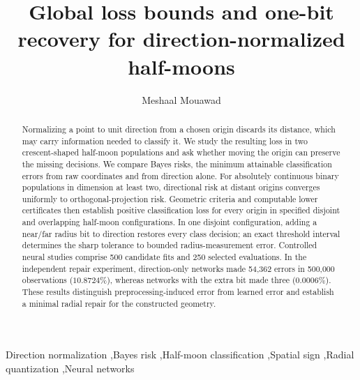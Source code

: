 \documentclass[a4paper,fleqn]{cas-dc}
\begin{document}
\let\WriteBookmarks\relax
\renewcommand{\printorcid}{}
\title[mode=title]{Global loss bounds and one-bit recovery for direction-normalized half-moons}
\author[1]{Meshaal Mouawad}
\cormark[1]
\begin{abstract}
Normalizing a point to unit direction from a chosen origin discards its distance, which may carry information needed to classify it. We study the resulting loss in two crescent-shaped half-moon populations and ask whether moving the origin can preserve the missing decisions. We compare Bayes risks, the minimum attainable classification errors from raw coordinates and from direction alone. For absolutely continuous binary populations in dimension at least two, directional risk at distant origins converges uniformly to orthogonal-projection risk. Geometric criteria and computable lower certificates then establish positive classification loss for every origin in specified disjoint and overlapping half-moon configurations. In one disjoint configuration, adding a near/far radius bit to direction restores every class decision; an exact threshold interval determines the sharp tolerance to bounded radius-measurement error. Controlled neural studies comprise 500 candidate fits and 250 selected evaluations. In the independent repair experiment, direction-only networks made 54,362 errors in 500,000 observations ($10.8724\%$), whereas networks with the extra bit made three ($0.0006\%$). These results distinguish preprocessing-induced error from learned error and establish a minimal radial repair for the constructed geometry.
\end{abstract}
\begin{keywords}
Direction normalization \sep Bayes risk \sep Half-moon classification \sep Spatial sign \sep Radial quantization \sep Neural networks
\end{keywords}
\maketitle
\end{document}
